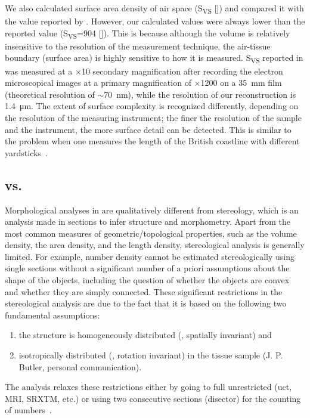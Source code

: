 We also calculated surface area density of air space (S\textsubscript{VS} [\centimetresquared\per\centimetrecubed]) and compared it with the value reported by \cite{Tschanz2003}. However, our calculated values were always lower than the reported value (S\textsubscript{VS}=904 [\centimetresquared\per\centimetrecubed]). This is because although the volume is relatively insensitive to the resolution of the measurement technique, the air-tissue boundary (surface area) is highly sensitive to how it is measured. S\textsubscript{VS} reported in \citet{Tschanz2003} was measured at a $\times$10 secondary magnification after recording the electron microscopical images at a primary magnification of $\times$1200 on a \SI{35}{\milli\meter} film (theoretical resolution of $\sim$\SI{70}{\nano\meter}), while the resolution of our \threed reconstruction is \SI{1.4}{\micro\meter}. The extent of surface complexity is recognized differently, depending on the resolution of the measuring instrument; the finer the resolution of the sample and the instrument, the more surface detail can be detected. This is similar to the problem when one measures the length of the British coastline with different yardsticks~\cite{Mandelbrot1967}.

\subsection{\twod vs. \threed}
Morphological analyses in \threed are qualitatively different from stereology, which is an analysis made in \twod sections to infer \threed structure and morphometry. Apart from the most common measures of geometric/topological properties, such as the volume density, the area density, and the length density, stereological analysis is generally limited. For example, number density cannot be estimated stereologically using single sections without a significant number of a priori assumptions about the shape of the objects, including the question of whether the objects are convex and whether they are simply connected. These significant restrictions in the stereological analysis are due to the fact that it is based on the following two fundamental assumptions: 
\begin{enumerate}
	\item the structure is homogeneously distributed (\ie, spatially invariant) and 
	\item isotropically distributed (\ie, rotation invariant) in the tissue sample (J. P. Butler, personal communication). 
\end{enumerate}
The \threed analysis relaxes these restrictions either by going to full unrestricted \threed (\ac{uct}, \ac{MRI}, \ac{SRXTM}, etc.) or using two consecutive sections (disector) for the counting of numbers~\cite{Hyde2007}.

